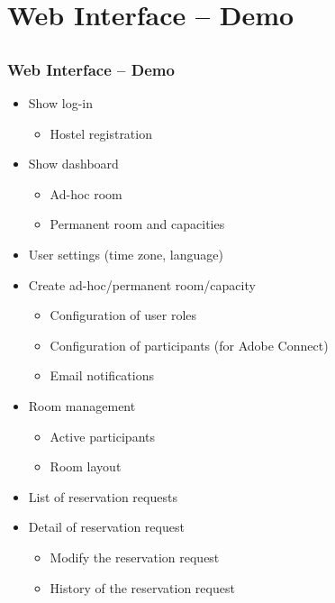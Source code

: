 \documentclass{beamer}
\begin{document}
\section{Web Interface -- Demo}\subsection{}

\begin{frame}
  \frametitle{Web Interface -- Demo}
  \begin{itemize}
    \item Show log-in
      \begin{itemize}
        \item Hostel registration    
      \end{itemize}
    \item Show dashboard
      \begin{itemize}
        \item Ad-hoc room
        \item Permanent room and capacities
      \end{itemize}
    \item User settings (time zone, language)      
    \item Create ad-hoc/permanent room/capacity
      \begin{itemize}
        \item Configuration of user roles
        \item Configuration of participants (for Adobe Connect)
        \item Email notifications
      \end{itemize}        
    \item Room management
      \begin{itemize}
        \item Active participants
        \item Room layout
      \end{itemize}    
    \item List of reservation requests
    \item Detail of reservation request
      \begin{itemize}
        \item Modify the reservation request
        \item History of the reservation request        
      \end{itemize}          
  \end{itemize}
\end{frame}
\end{document}
